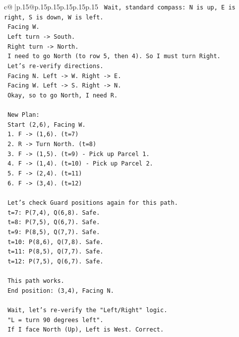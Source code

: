 \documentclass{article}
\begin{document}
{\begin{supertabular}{c@{$\;$}|p{.15\linewidth}@{}p{.15\linewidth}p{.15\linewidth}p{.15\linewidth}p{.15\linewidth}p{.15\linewidth}}
{{{\texttt{   Wait, standard compass: N is up, E is right, S is down, W is left.} \\
\texttt{   Facing W.} \\
\texttt{   Left turn {-}> South.} \\
\texttt{   Right turn {-}> North.} \\
\texttt{   I need to go North (to row 5, then 4). So I must turn Right.} \\
\texttt{   Let's re{-}verify directions.} \\
\texttt{   Facing N. Left {-}> W. Right {-}> E.} \\
\texttt{   Facing W. Left {-}> S. Right {-}> N.} \\
\texttt{   Okay, so to go North, I need R.} \\
\\ 
\texttt{   New Plan:} \\
\texttt{   Start (2,6), Facing W.} \\
\texttt{   1. F {-}> (1,6). (t=7)} \\
\texttt{   2. R {-}> Turn North. (t=8)} \\
\texttt{   3. F {-}> (1,5). (t=9) {-} Pick up Parcel 1.} \\
\texttt{   4. F {-}> (1,4). (t=10) {-} Pick up Parcel 2.} \\
\texttt{   5. F {-}> (2,4). (t=11)} \\
\texttt{   6. F {-}> (3,4). (t=12)} \\
\\ 
\texttt{   Let's check Guard positions again for this path.} \\
\texttt{   t=7: P(7,4), Q(6,8). Safe.} \\
\texttt{   t=8: P(7,5), Q(6,7). Safe.} \\
\texttt{   t=9: P(8,5), Q(7,7). Safe.} \\
\texttt{   t=10: P(8,6), Q(7,8). Safe.} \\
\texttt{   t=11: P(8,5), Q(7,7). Safe.} \\
\texttt{   t=12: P(7,5), Q(6,7). Safe.} \\
\\ 
\texttt{   This path works.} \\
\texttt{   End position: (3,4), Facing N.} \\
\\ 
\texttt{   Wait, let's re{-}verify the "Left/Right" logic.} \\
\texttt{   "L = turn 90 degrees left".} \\
\texttt{   If I face North (Up), Left is West. Correct.} \\
}}}
\end{supertabular}}
\end{document}
